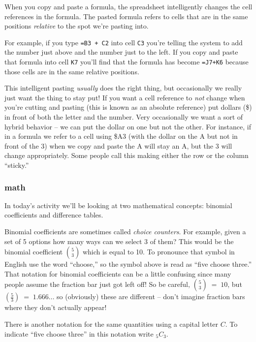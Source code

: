 When you copy and paste a formula, the spreadsheet intelligently changes the cell references in the formula.  The pasted formula refers to cells that are in the same positions {\em relative} to the spot we're pasting into.  

For example, if you type {\tt =B3 + C2}  into cell {\tt C3} you're telling the system to add the number just above and the number just to the left.  If you copy and paste that formula into cell {\tt K7} you'll find that the formula has become {\tt =J7+K6} because those cells are in the same relative positions.

This intelligent pasting {\em usually} does the right thing, but occasionally we really just want the thing to stay put!  If you want a cell reference to {\em not} change when you're cutting and pasting (this is known as an absolute reference) put dollars (\$) in front of both the letter and the number.  Very occasionally we want a sort of hybrid behavior -- we can put the dollar on one but not the other.  For instance, if in a formula we refer to a cell using \$A3  (with the dollar on the A but not in front of the 3) when we copy and paste the A will stay an A, but the 3 will change appropriately.  Some people call this making either the row or the column ``sticky.''  

\subsubsection{math}

In today's activity we'll be looking at two mathematical concepts: binomial coefficients and difference tables.

Binomial coefficients are sometimes called {\em choice counters}.  For example, given a set of 5 options how many ways can we select 3 of them?  This would be the binomial coefficient $\binom{5}{3}$ which is equal to 10.  To pronounce that symbol in English use the word ``choose,''  so the symbol above is read as ``five choose three.''  That notation for binomial coefficients can be a little confusing since many people assume the fraction bar just got left off!  So be careful, $\binom{5}{3} \; = \; 10$, but $\left( \frac{5}{3} \right) \; = \; 1.666\ldots$  so (obviously) these are different -- don't imagine fraction bars where they don't actually appear!

There is another notation for the same quantities using a capital letter $C$.  To indicate ``five choose three'' in this notation write $_5C_3$.

